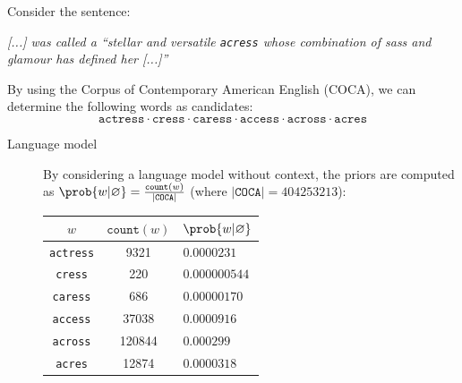\begin{example}
    Consider the sentence:
    \begin{center}
        \parbox{0.65\linewidth}{
            \textit{\textnormal{[...]} was called a ``stellar and versatile \texttt{acress} whose combination of sass and glamour has defined her \textnormal{[...]}''}
        }
    \end{center}
    By using the Corpus of Contemporary American English (COCA), we can determine the following words as candidates:
    \[
        \texttt{actress} \cdot \texttt{cress} \cdot \texttt{caress} \cdot \texttt{access} \cdot \texttt{across} \cdot \texttt{acres}
    \]

    \begin{description}
        \item[Language model] By considering a language model without context, the priors are computed as $\prob{w | \varnothing} = \frac{\texttt{count}(w)}{\vert \texttt{COCA} \vert}$ (where $\vert \texttt{COCA} \vert = \num{404253213}$):
        \begin{table}[H]
            \centering
            \footnotesize
            \begin{tabular}{ccl}
                \toprule
                $w$ & $\texttt{count}(w)$ & $\prob{w | \varnothing}$ \\
                \midrule
                \texttt{actress}    & \num{9321}    & $0.0000231$   \\
                \texttt{cress}      & \num{220}     & $0.000000544$ \\
                \texttt{caress}     & \num{686}     & $0.00000170$  \\
                \texttt{access}     & \num{37038}   & $0.0000916$   \\
                \texttt{across}     & \num{120844}  & $0.000299$    \\
                \texttt{acres}      & \num{12874}   & $0.0000318$   \\
                \bottomrule
            \end{tabular}
        \end{table}


\end{description}
\end{example}
